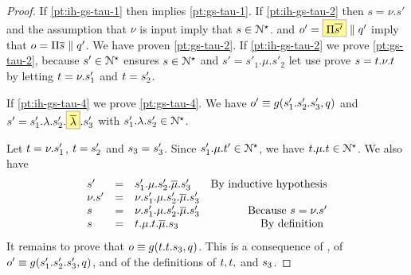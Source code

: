\begin{proof}
  If \ref{pt:ih-gs-tau-1} then  implies \ref{pt:gs-tau-1}.
  If \ref{pt:ih-gs-tau-2} then $s = \nu.s' $ and the assumption that $\nu$ is input
  imply that $s \in \mathcal{N}^\star$.  and $o' = \mailbox{ \Pi \co{s'}} \Par q'$
  imply that $o = \Pi \overline{s} \mathrel{\parallel} q'$. We have proven \ref{pt:gs-tau-2}.
  If \ref{pt:ih-gs-tau-2} we prove \ref{pt:gs-tau-2}, because
  $ s' \in \mathcal{N}^\star$ ensures $s \in \mathcal{N}^\star$ and $s' = s'_1 . \mu . s'_2$
  let use prove $s = t . \nu . t$ by letting $t = \nu.s'_1$ and $t = s'_2$.

  If \ref{pt:ih-gs-tau-4} we prove \ref{pt:gs-tau-4}.
  We have $o' \equiv g(s'_1.s'_2.s'_3, q)$
  and $s' = s'_1 . \lambda . s'_2 . \out{\lambda} .s'_3$
  with $s'_1 . \lambda . s'_2 \in \mathcal{N}^{\star}$.

  Let $t = \nu . s'_1 $, $t =  s'_2$ and $s_3 = s'_3$.
  Since  $ s'_1 . \mu  . t' \in \mathcal{N}^\star$, we have $t . \mu  . t \in \mathcal{N}^\star$.
  We also have
  $$
  \begin{array}{lllr}
    s' & = & s'_1 . \mu . s'_2 . \overline{\mu} . s'_3 & \text{By inductive hypothesis}\\
    \nu.s' & = & \nu.s'_1 . \mu . s'_2 . \overline{\mu} . s'_3 \\
    s & = & \nu.s'_1 . \mu . s'_2 . \overline{\mu} . s'_3 & \text{Because } s = \nu.s'\\
    s & = & t . \mu . t . \overline{\mu} . s_3 & \text{By definition }
  \end{array}
  $$
  It remains to prove that $o \equiv g(t.t.s_3, q)$.
  This is a consequence of , of
  $o' \equiv g(s'_1.s'_2.s'_3, q)$, and of the definitions of $t, t,$ and $s_3$.
\end{proof}










